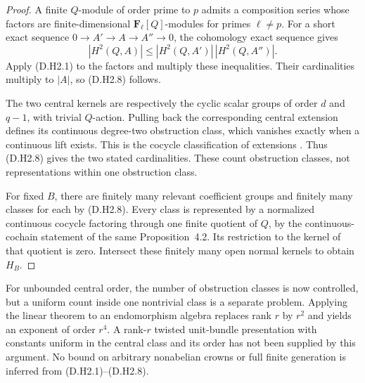 \begin{proof}
A finite $Q$-module of order prime to $p$ admits a
composition series whose factors are finite-dimensional
$\mathbf F_\ell[Q]$-modules for primes $\ell\ne p$.
For a short exact sequence $0\to A'\to A\to A''\to0$,
the cohomology exact sequence gives
\[
                 |H^2(Q,A)|
                   \le |H^2(Q,A')|\,|H^2(Q,A'')|.
\]
Apply (D.H2.1) to the factors and multiply these
inequalities.  Their cardinalities multiply to $|A|$,
so (D.H2.8) follows.

The two central kernels are respectively the cyclic
scalar groups of order $d$ and $q-1$, with trivial
$Q$-action.  Pulling back the corresponding central
extension defines its continuous degree-two
obstruction class, which vanishes exactly when a
continuous lift exists.  This is the cocycle
classification of extensions
\citep[II, Example~1.18(b), pp.~65--66, and
Proposition~4.2, p.~87]{MilneCFT2020D}.
Thus (D.H2.8) gives the two stated cardinalities.
These count obstruction classes, not representations
within one obstruction class.

For fixed $B$, there are finitely many relevant
coefficient groups and finitely many classes for
each by (D.H2.8).  Every class is represented by a
normalized continuous cocycle factoring through
one finite quotient of $Q$, by the continuous-cochain
statement of the same Proposition~4.2.  Its restriction
to the kernel of that quotient is zero.  Intersect
these finitely many open normal kernels to obtain
$H_B$.
\end{proof}

\begin{remark}
For unbounded central order, the number of obstruction classes
is now controlled, but a uniform count inside one nontrivial
class is a separate problem.  Applying the linear theorem to
an endomorphism algebra replaces rank $r$ by $r^2$ and yields
an exponent of order $r^4$.  A rank-$r$ twisted unit-bundle
presentation with constants uniform in the central class and
its order has not been supplied by this argument.  No bound
on arbitrary nonabelian crowns or full finite generation is
inferred from (D.H2.1)--(D.H2.8).
\end{remark}
